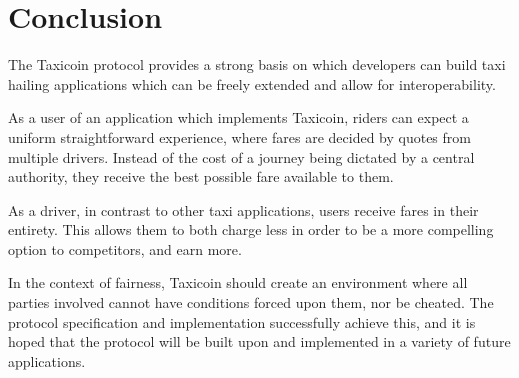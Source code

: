 \section{Conclusion}

The Taxicoin protocol provides a strong basis on which developers can build taxi hailing applications which can be freely extended and allow for interoperability.

As a user of an application which implements Taxicoin, riders can expect a uniform straightforward experience, where fares are decided by quotes from multiple drivers. Instead of the cost of a journey being dictated by a central authority, they receive the best possible fare available to them.

As a driver, in contrast to other taxi applications, users receive fares in their entirety. This allows them to both charge less in order to be a more compelling option to competitors, and earn more.

In the context of fairness, Taxicoin should create an environment where all parties involved cannot have conditions forced upon them, nor be cheated. The protocol specification and implementation successfully achieve this, and it is hoped that the protocol will be built upon and implemented in a variety of future applications.
